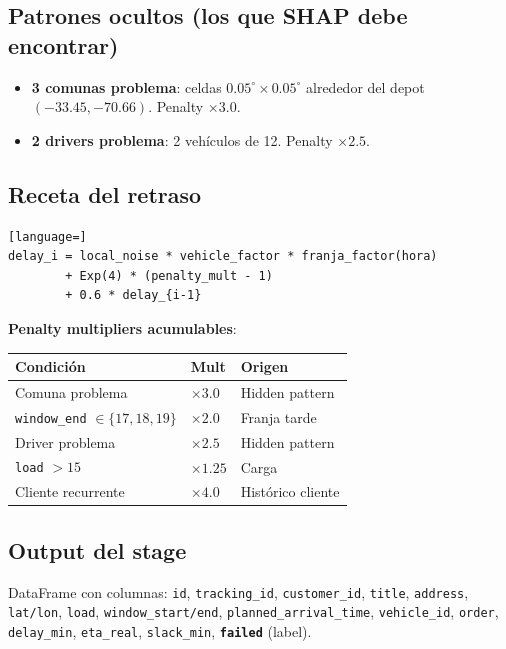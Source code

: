 \documentclass[11pt,a4paper]{article}
\begin{document}
\subsection{Patrones ocultos (los que SHAP debe encontrar)}

\begin{itemize}
  \item \textbf{3 comunas problema}: celdas $0.05^{\circ} \times 0.05^{\circ}$ alrededor del depot $(-33.45, -70.66)$. Penalty $\times 3.0$.
  \item \textbf{2 drivers problema}: 2 vehículos de 12. Penalty $\times 2.5$.
\end{itemize}

\subsection{Receta del retraso}

\begin{lstlisting}[language=]
delay_i = local_noise * vehicle_factor * franja_factor(hora)
        + Exp(4) * (penalty_mult - 1)
        + 0.6 * delay_{i-1}
\end{lstlisting}

\textbf{Penalty multipliers acumulables}:

\begin{tabular}{lll}
\toprule
\textbf{Condición} & \textbf{Mult} & \textbf{Origen} \\
\midrule
Comuna problema & $\times 3.0$ & Hidden pattern \\
\texttt{window\_end} $\in \{17,18,19\}$ & $\times 2.0$ & Franja tarde \\
Driver problema & $\times 2.5$ & Hidden pattern \\
\texttt{load} $> 15$ & $\times 1.25$ & Carga \\
Cliente recurrente & $\times 4.0$ & Histórico cliente \\
\bottomrule
\end{tabular}

\subsection{Output del stage}

DataFrame con columnas: \texttt{id}, \texttt{tracking\_id}, \texttt{customer\_id}, \texttt{title}, \texttt{address}, \texttt{lat/lon}, \texttt{load}, \texttt{window\_start/end}, \texttt{planned\_arrival\_time}, \texttt{vehicle\_id}, \texttt{order}, \texttt{delay\_min}, \texttt{eta\_real}, \texttt{slack\_min}, \textbf{\texttt{failed}} (label).
\end{document}
